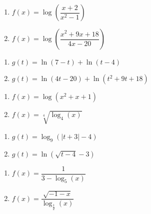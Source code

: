 \documentclass{ximera}
\begin{document}
\begin{multicols}{2}
\begin{enumerate}
\setcounter{enumi}{\value{HW}}

\item $f(x) = \log \left(\dfrac{x + 2}{x^{2} - 1}\right)$
\item $f(x) = \log\left(\dfrac{x^2+9x+18}{4x-20}\right)$

\setcounter{HW}{\value{enumi}}
\end{enumerate}
\end{multicols}

\begin{multicols}{2}
\begin{enumerate}
\setcounter{enumi}{\value{HW}}

\item $g(t) = \ln(7 - t) + \ln(t - 4)$
\item $g(t) = \ln(4t-20) + \ln\left(t^2+9t+18\right)$

\setcounter{HW}{\value{enumi}}
\end{enumerate}
\end{multicols}

\begin{multicols}{2}
\begin{enumerate}
\setcounter{enumi}{\value{HW}}

\item $f(x) = \log\left(x^2+x+1\right)$
\item $f(x) = \sqrt[4]{\log_{4} (x)}$

\setcounter{HW}{\value{enumi}}
\end{enumerate}
\end{multicols}

\begin{multicols}{2}
\begin{enumerate}
\setcounter{enumi}{\value{HW}}

\item $g(t) = \log_{9}(|t + 3| - 4)$
\item $g(t) = \ln(\sqrt{t - 4} - 3)$

\setcounter{HW}{\value{enumi}}
\end{enumerate}
\end{multicols}

\begin{multicols}{2}
\begin{enumerate}
\setcounter{enumi}{\value{HW}}

\item $f(x) = \dfrac{1}{3 - \log_{5} (x)}$
\item $f(x) = \dfrac{\sqrt{-1 - x}}{\log_{\frac{1}{2}} (x)}$

\setcounter{HW}{\value{enumi}}
\end{enumerate}
\end{multicols}
\end{document}

